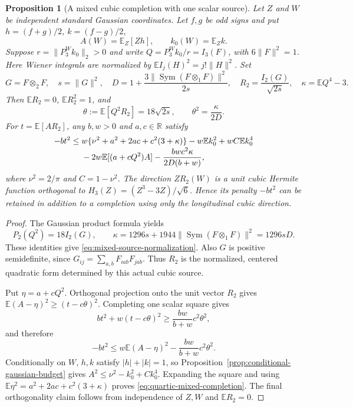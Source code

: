 \documentclass[11pt]{article}
\newtheorem{proposition}[theorem]{Proposition}
\begin{document}
\begin{proposition}[A mixed cubic completion with one scalar source]
\label{prop:mixed-cubic-completion}
Let $Z$ and $W$ be independent standard Gaussian coordinates.  Let $f,g$
be odd signs and put $h=(f+g)/2$, $k=(f-g)/2$,
\[
 A(W)=\mathbb E_Z[Zh],\qquad k_0(W)=\mathbb E_Z k.
\]
Suppose $r=\|P_3^Wk_0\|_2>0$ and write
$Q=P_3^Wk_0/r=I_3(F)$, with $6\|F\|^2=1$.  Here Wiener integrals are
normalized by $\mathbb E I_j(H)^2=j!\|H\|^2$.
Set
\[
 G=F\otimes_2F,\quad s=\|G\|^2,\quad
 D=1+\frac{3\|\operatorname{Sym}(F\otimes_1F)\|^2}{2s},\quad
 R_2=\frac{I_2(G)}{\sqrt{2s}},\quad \kappa=\mathbb E Q^4-3.
\]
Then $\mathbb ER_2=0$, $\mathbb ER_2^2=1$, and
\begin{equation}\label{eq:mixed-source-normalization}
 \theta:=\mathbb E[Q^2R_2]=18\sqrt{2s},\qquad
 \theta^2=\frac{\kappa}{2D}.
\end{equation}
For $t=\mathbb E[AR_2]$, any $b,w>0$ and $a,c\in\mathbb R$ satisfy
\begin{align}
 -bt^2\leq{}&w\{\nu^2+a^2+2ac+c^2(3+\kappa)\}
 -w\mathbb E k_0^2+wC\mathbb E k_0^4
 \notag\\[-1mm]
 &-2w\mathbb E[(a+cQ^2)A]
 -\frac{bw c^2\kappa}{2D(b+w)},
 \label{eq:quartic-mixed-completion}
\end{align}
where $\nu^2=2/\pi$ and $C=1-\nu^2$.
The direction $ZR_2(W)$ is a unit cubic Hermite function orthogonal to
$H_3(Z)=(Z^3-3Z)/\sqrt6$.  Hence its penalty $-bt^2$ can be retained
in addition to a completion using only the longitudinal cubic direction.
\end{proposition}

\begin{proof}
The Gaussian product formula yields
\[
 P_2(Q^2)=18I_2(G),\qquad
 \kappa=1296s+1944\|\operatorname{Sym}(F\otimes_1F)\|^2=1296sD.
\]
These identities give \eqref{eq:mixed-source-normalization}.
Also $G$ is positive semidefinite, since
$G_{ij}=\sum_{a,b}F_{iab}F_{jab}$.  Thus $R_2$ is the normalized,
centered quadratic form determined by this actual cubic source.

Put $\eta=a+cQ^2$.  Orthogonal projection onto the unit vector $R_2$
gives $\mathbb E(A-\eta)^2\geq(t-c\theta)^2$.  Completing one scalar
square gives
\[
 bt^2+w(t-c\theta)^2\geq\frac{bw}{b+w}c^2\theta^2,
\]
and therefore
\[
 -bt^2\leq w\mathbb E(A-\eta)^2-
 \frac{bw}{b+w}c^2\theta^2.
\]
Conditionally on $W$, $h,k$ satisfy $|h|+|k|=1$, so
Proposition~\ref{prop:conditional-gaussian-budget} gives
$A^2\leq\nu^2-k_0^2+Ck_0^4$.  Expanding the square and using
$\mathbb E\eta^2=a^2+2ac+c^2(3+\kappa)$ proves
\eqref{eq:quartic-mixed-completion}.  The final orthogonality claim
follows from independence of $Z,W$ and $\mathbb ER_2=0$.
\end{proof}
\end{document}
